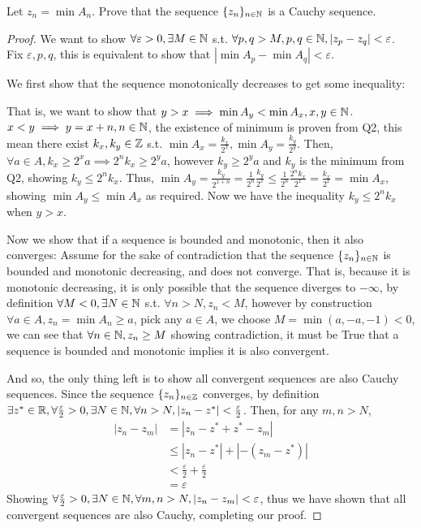 \documentclass{homework}
\newcommand{\R}{\bb{R}} %
\newcommand{\Z}{\bb{Z}} %
\newcommand{\N}{\bb{N}} %
\newcommand{\?}{\stackrel{?}{=}}
\newcommand{\ep}{\varepsilon}
\theoremstyle{definition}
\begin{document}
\question[3] Let $z_n=\min A_n.$ Prove that the sequence $\{z_n\}_{n\in\N}$ is a Cauchy sequence. 

\begin{proof}
    We want to show $\forall \ep > 0, \exists M\in\N$ s.t. $\forall p,q>M, p,q\in\N, |z_p-z_q|<\ep$. Fix $\ep, p, q$, this is equivalent to show that $|\min A_p - \min A_q|<\ep$. 

    We first show that the sequence monotonically decreases to get some inequality: 
    
    That is, we want to show that $y>x\implies\min A_y<\min A_x, x,y\in\N$. $x<y\implies y=x+n,n\in\N$, the existence of minimum is proven from Q2, this mean there exist $k_x, k_y\in\Z$ s.t. $\min A_x=\frac{k_x}{2^x}, \min A_y=\frac{k_y}{2^y}$. Then, $\forall a\in A, k_x\geq 2^xa\implies 2^nk_x\geq2^ya$, however $k_y\geq 2^ya$ and $k_y$ is the minimum from Q2, showing $k_y\leq 2^nk_x$. Thus, $\min A_y=\frac{k_y}{2^{x+n}}=\frac1{2^n}\frac{k_y}{2^x}\leq\frac1{2^n}\frac{2^nk_x}{2^x}=\frac{k_x}{2^x}=\min A_x$, showing $\min A_y\leq \min A_x$ as required. Now we have the inequality $k_y\leq 2^nk_x$ when $y>x$. 

Now we show that if a sequence is bounded and monotonic, then it also converges: Assume for the sake of contradiction that the sequence $\{z_n\}_{n\in\N}$ is bounded and monotonic decreasing, and does not converge. That is, because it is monotonic decreasing, it is only possible that the sequence diverges to $-\infty$, by definition $\forall M<0, \exists N\in\N$ s.t. $\forall n>N, z_n<M$, however by construction $\forall a\in A, z_n=\min A_n\geq a$, pick any $a\in A$, we choose $M =\min (a, -a, -1)<0$, we can see that $\forall n\in\N, z_n\geq M$ showing contradiction, it must be True that a sequence is bounded and monotonic implies it is also convergent.

And so, the only thing left is to show all convergent sequences are also Cauchy sequences. Since the sequence $\{z_n\}_{n\in\Z}$ converges, by definition $\exists z^*\in\R, \forall \frac{\ep}{2}>0, \exists N\in\N, \forall n>N, |z_n-z^*|<\frac{\ep}{2}$. Then, for any $m,n>N$, \begin{align*}
    |z_n-z_m| &= |z_n-z^*+z^*-z_m|\\
    &\leq |z_n-z^*|+|-(z_m-z^*)|\\
    &<\frac{\ep}{2} + \frac{\ep}{2}\\
    &=\ep
\end{align*}
Showing $\forall\frac{\ep}{2}>0, \exists N\in\N,\forall m,n>N, |z_n-z_m|<\ep$, thus we have shown that all convergent sequences are also Cauchy, completing our proof. 
\end{proof}
\end{document}
